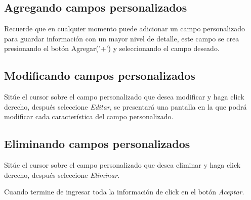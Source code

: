 \subsection{Agregando campos personalizados}
\label{sec:agregarCamposPlantilla}
Recuerde que en cualquier momento puede adicionar un campo personalizado para guardar informaci\'on con un mayor nivel de detalle, este campo se crea presionando el bot\'on Agregar('+') y seleccionando el campo deseado.

\subsection{Modificando campos personalizados}
\label{sec:modificarCamposPlantilla}
Sit\'ue el cursor sobre el campo personalizado que desea modificar y haga click derecho, despu\'es seleccione \emph{Editar},
se presentar\'a una pantalla en la que podr\'a modificar cada caracter\'istica
del campo personalizado.

\subsection{Eliminando campos personalizados}
\label{sec:eliminarCamposPlantilla}
Sit\'ue el cursor sobre el campo personalizado que desea eliminar y haga click derecho, despu\'es seleccione \emph{Eliminar}.

Cuando termine de ingresar toda la informaci\'on de click en el bot\'on \emph{Aceptar}.